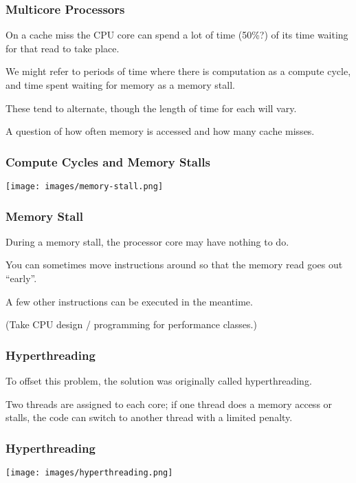 \begin{frame}
\frametitle{Multicore Processors}

On a cache miss the CPU core can spend a lot of time (50\%?) of its time waiting for that read to take place.

  We might refer to periods of time where there is computation as a compute cycle, and time spent waiting for memory as a \alert{memory stall}. 
  
  These tend to alternate, though the length of time for each will vary. 
  
  A question of how often memory is accessed and how many cache misses.

\end{frame}

\begin{frame}
\frametitle{Compute Cycles and Memory Stalls}

\begin{center}
	\texttt{[image: images/memory-stall.png]}
\end{center}

\end{frame}

\begin{frame}
\frametitle{Memory Stall}

During a memory stall, the processor core may have nothing to do. 

You can sometimes move instructions around so that the memory read goes out ``early''.

A few other instructions can be executed in the meantime. 

(Take CPU design / programming for performance classes.)

\end{frame}

\begin{frame}
\frametitle{Hyperthreading}

To offset this problem, the solution was originally called \alert{hyperthreading}.

Two threads are assigned to each core; if one thread does a memory access or stalls, the code can switch to another thread with a limited penalty. 

\end{frame}

\begin{frame}
\frametitle{Hyperthreading}

\begin{center}
	\texttt{[image: images/hyperthreading.png]}
\end{center}

\end{frame}

